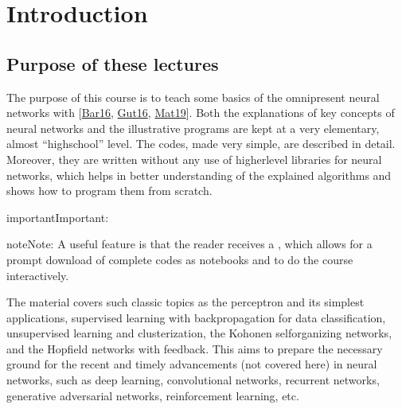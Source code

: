 \documentclass[letterpaper,10pt,english]{jupyterBook}
\begin{document}
\sphinxAtStartPar
{}

\begin{sphinxVerbatim}[commandchars=\\\{\}]

\end{sphinxVerbatim}


\chapter{Introduction}
\label{\detokenize{docs/intro:introduction}}\label{\detokenize{docs/intro::doc}}

\section{Purpose of these lectures}
\label{\detokenize{docs/intro:purpose-of-these-lectures}}
\sphinxAtStartPar
The purpose of this course is to teach some basics of the omnipresent neural networks with  {[}\hyperlink{cite.docs/conclusion:id5}{Bar16}, \hyperlink{cite.docs/conclusion:id3}{Gut16}, \hyperlink{cite.docs/conclusion:id2}{Mat19}{]}. Both the explanations of key concepts of neural networks and the illustrative programs are kept at a very elementary, almost “high\sphinxhyphen{}school” level. The codes, made very simple, are described in detail. Moreover, they are written without any use of higher\sphinxhyphen{}level libraries for neural networks, which helps in better understanding of the explained algorithms and shows how to program them from scratch.

\begin{sphinxadmonition}{important}{Important:}
\sphinxAtStartPar
{}
\end{sphinxadmonition}

\begin{sphinxadmonition}{note}{Note:}
\sphinxAtStartPar
A useful feature is that the reader receives a , which allows for
a prompt download of complete codes as
 notebooks and to do the course interactively.
\end{sphinxadmonition}

\sphinxAtStartPar
The material covers such classic topics as the perceptron and its simplest applications, supervised learning with back\sphinxhyphen{}propagation for data classification, unsupervised learning and clusterization, the Kohonen self\sphinxhyphen{}organizing networks, and the Hopfield networks with feedback. This aims to prepare the necessary ground for the recent and timely advancements (not covered here) in neural networks, such as deep learning, convolutional networks, recurrent networks, generative adversarial networks, reinforcement learning, etc.
\end{document}
